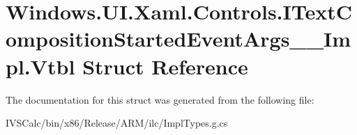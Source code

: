 \hypertarget{struct_windows_1_1_u_i_1_1_xaml_1_1_controls_1_1_i_text_composition_started_event_args_____impl_1_1_vtbl}{}\section{Windows.\+U\+I.\+Xaml.\+Controls.\+I\+Text\+Composition\+Started\+Event\+Args\+\_\+\+\_\+\+Impl.\+Vtbl Struct Reference}
\label{struct_windows_1_1_u_i_1_1_xaml_1_1_controls_1_1_i_text_composition_started_event_args_____impl_1_1_vtbl}


The documentation for this struct was generated from the following file\+:\begin{DoxyCompactItemize}
\item 
I\+V\+S\+Calc/bin/x86/\+Release/\+A\+R\+M/ilc/Impl\+Types.\+g.\+cs\end{DoxyCompactItemize}
